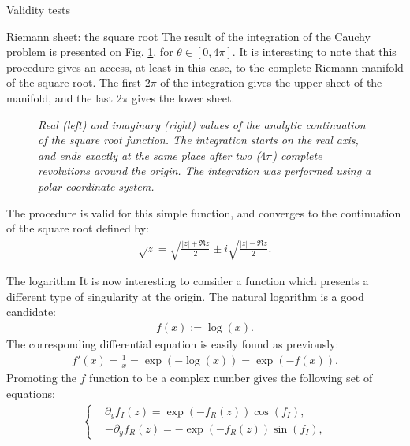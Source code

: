 \begin{section}{Validity tests}
\begin{subsection}{Riemann sheet: the square root}
    The result of the integration of the Cauchy problem is presented
    on Fig. \ref{fig:3d_sqrt}, for $\theta \in [0,4\pi]$. It is interesting to
    note that this procedure gives an access, at least in this case,
    to the complete Riemann manifold of the square root. The first
    $2\pi$ of the integration gives the upper sheet of the manifold,
    and the last $2\pi$ gives the lower sheet.

    \begin{figure}[!ht]
      \begin{center}
        
        
        \caption{\em Real (left) and imaginary (right) values of the
          analytic continuation of the square root function. The
          integration starts on the real axis, and ends exactly at the
          same place after two ($4\pi$) complete revolutions around
          the origin. The integration was performed using a polar
          coordinate system.}
        \label{fig:3d_sqrt}
      \end{center}
    \end{figure}
    The procedure is valid for this simple function, and converges to
    the continuation of the square root defined by:
    \begin{align}
      \sqrt{z} = \sqrt{\frac{\left|z\right|+\Re z}{2}}\pm i\sqrt{\frac{\left|z\right|-\Re z}{2}}.
    \end{align}
  \end{subsection}
  \begin{subsection}{The logarithm}
    It is now interesting to consider a function which presents a
    different type of singularity at the origin. The natural logarithm
    is a good candidate:
    \begin{align}
      f(x) := \log(x).
    \end{align}
    The corresponding differential equation is easily found as previously:
    \begin{align}
      f'(x) = \frac{1}{x} = \exp(-\log(x)) = \exp(-f(x)).
    \end{align}
    Promoting the $f$ function to be a complex number gives the
    following set of equations:
    \begin{align}
      \left\{
      \begin{aligned}
        &\partial_yf_I(z) = \exp(-f_R(z))\cos(f_I),\\
        &-\partial_yf_R(z) = -\exp(-f_R(z))\sin(f_I),
      \end{aligned}

\end{align}
\end{subsection}
\end{section}
